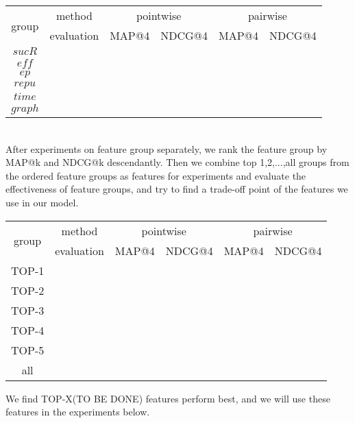 \begin{tabular}{|c|c|c|c|c|c|}

\hline
\multirow{2}{*}{group}  & method  & \multicolumn{2}{c|}{pointwise}  & \multicolumn{2}{c|}{pairwise} \\
\cline{2-6}
 &evaluation&MAP@4&NDCG@4&MAP@4&NDCG@4 \\
\hline
$sucR$ & & & & &\\
\hline
$eff$ & & & & &\\
\hline  
$ep$ & & & & &\\
\hline
$repu$ & & & & &\\
\hline
$time$ & & & & &\\
\hline
$graph$ & & & & &\\
\hline
\end{tabular}
\\
After experiments on feature group separately, we rank the feature group by MAP@k and NDCG@k descendantly. Then we combine top 1,2,...,all groups from the ordered feature groups as features for experiments and evaluate the effectiveness of feature groups, and try to find a trade-off point of the features we use in our model.\\
\begin{tabular}{|c|c|c|c|c|c|}

\hline
\multirow{2}{*}{group}  & method  & \multicolumn{2}{c|}{pointwise}  & \multicolumn{2}{c|}{pairwise} \\
\cline{2-6}
 &evaluation&MAP@4&NDCG@4&MAP@4&NDCG@4 \\
\hline
TOP-1 & & & & &\\
\hline
TOP-2 & & & & &\\
\hline  
TOP-3 & & & & &\\
\hline
TOP-4 & & & & &\\
\hline
TOP-5 & & & & &\\
\hline
all & & & & &\\
\hline
\end{tabular}
We find TOP-X(TO BE DONE) features perform best, and we will use these features in the experiments below.

